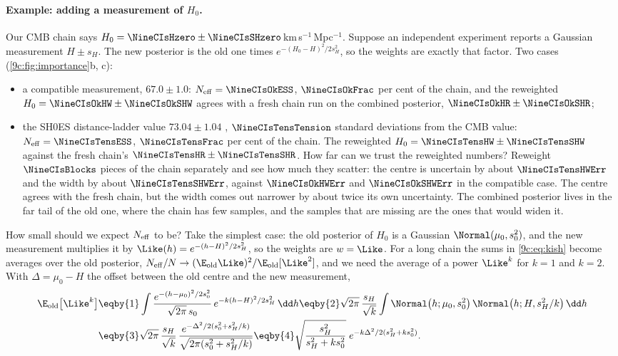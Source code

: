 \paragraph{Example: adding a measurement of $H_0$.} Our CMB chain says $H_0=\NineCIsHzero\pm\NineCIsSHzero$\,km\,s$^{-1}$\,Mpc$^{-1}$.
Suppose an independent experiment reports a Gaussian measurement $H\pm s_H$. The new posterior is the old one times
$e^{-(H_0-H)^2/2s_H^2}$, so the weights are exactly that factor. Two cases (\cref{9c:fig:importance}b, c):
\begin{itemize}[itemsep=1pt]
  \item a compatible measurement, $67.0\pm1.0$: $N_{\rm eff}=\NineCIsOkESS$, $\NineCIsOkFrac$ per cent of the chain, and the
        reweighted $H_0=\NineCIsOkHW\pm\NineCIsOkSHW$ agrees with a fresh chain run on the combined posterior,
        $\NineCIsOkHR\pm\NineCIsOkSHR$;
  \item the SH0ES distance-ladder value $73.04\pm1.04$ \cite{Riess2022SH0ES}, $\NineCIsTensTension$ standard deviations
        from the CMB value: $N_{\rm eff}=\NineCIsTensESS$, $\NineCIsTensFrac$ per cent of the chain. The reweighted
        $H_0=\NineCIsTensHW\pm\NineCIsTensSHW$ against the fresh chain's $\NineCIsTensHR\pm\NineCIsTensSHR$. How far
        can we trust the reweighted numbers? Reweight $\NineCIsBlocks$ pieces of the chain separately and see how
        much they scatter: the centre is uncertain by about $\NineCIsTensHWErr$ and the width by about
        $\NineCIsTensSHWErr$, against $\NineCIsOkHWErr$ and $\NineCIsOkSHWErr$ in the compatible case. The
        centre agrees with the fresh chain, but the width comes out narrower by about twice its own
        uncertainty. The combined posterior lives in the far tail of the old one, where the chain has
        few samples, and the samples that are missing are the ones that would widen it.
\end{itemize}
How small should we expect $N_{\rm eff}$ to be? Take the simplest case: the old posterior of $H_0$ is a Gaussian
$\Normal(\mu_0,s_0^2)$, and the new measurement multiplies it by $\Like(h)=e^{-(h-H)^2/2s_H^2}$, so the weights are
$w=\Like$. For a long chain the sums in \eqref{9c:eq:kish} become averages over the old posterior,
$N_{\rm eff}/N\to(\E_{\rm old}\Like)^2/\E_{\rm old}[\Like^2]$, and we need the average of a power $\Like^k$ for $k=1$
and $k=2$. With $\Delta=\mu_0-H$ the offset between the old centre and the new measurement,
\begin{align}
  \E_{\rm old}\bigl[\Like^k\bigr]
  &\eqby{1}\int\frac{e^{-(h-\mu_0)^2/2s_0^2}}{\sqrt{2\pi}\,s_0}\,e^{-k(h-H)^2/2s_H^2}\,\dd h
   \eqby{2}\sqrt{2\pi}\,\frac{s_H}{\sqrt k}\int\Normal\bigl(h;\mu_0,s_0^2\bigr)\,\Normal\bigl(h;H,s_H^2/k\bigr)\,\dd h
   \nonumber\\
  &\eqby{3}\sqrt{2\pi}\,\frac{s_H}{\sqrt k}\,\frac{e^{-\Delta^2/2(s_0^2+s_H^2/k)}}{\sqrt{2\pi(s_0^2+s_H^2/k)}}
   \eqby{4}\sqrt{\frac{s_H^2}{s_H^2+ks_0^2}}\;e^{-k\Delta^2/2(s_H^2+ks_0^2)} .
  \label{9c:eq:ess-moment}
\end{align}
